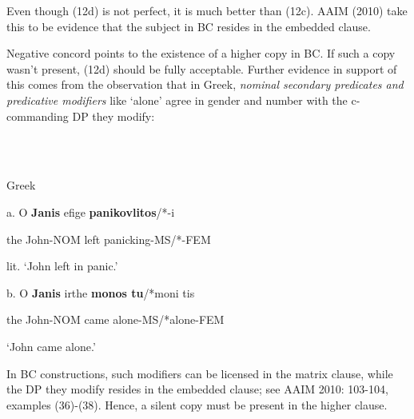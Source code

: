 \documentclass[output=paper]{langsci/langscibook}
\begin{document}
\begin{styleTextkrperxxi}
Even though (12d) is not perfect, it is much better than (12c). AAIM (2010) take this to be evidence that the subject in BC resides in the embedded clause. 
\end{styleTextkrperxxi}

\begin{styleNurTexti}
  Negative concord points to the existence of a higher copy in BC. If such a copy wasn’t present, (12d) should be fully acceptable. Further evidence in support of this comes from the observation that in Greek, \textit{nominal secondary predicates and predicative modifiers} like ‘alone’ agree in gender and number with the c-commanding DP they modify:
\end{styleNurTexti}

\begin{styleNurTexti}
\ea%
    \label{ex:key:13}
    \gll\\
        \\
    \glt
    \z

          Greek
\end{styleNurTexti}

\begin{styleNurTexti}
a.  O    \textbf{Janis}        efige  \textbf{panikovlitos}/*-i      
\end{styleNurTexti}

\begin{styleNurTexti}
    the John-NOM  left    panicking-MS/*-FEM
\end{styleNurTexti}

\begin{styleNurTexti}
    lit. ‘John left in panic.’
\end{styleNurTexti}

\begin{styleNurTexti}
  b.  O    \textbf{Janis}         irthe   \textbf{monos tu}/*moni tis
\end{styleNurTexti}

\begin{styleNurTexti}
    the John-NOM  came   alone-MS/*alone-FEM
\end{styleNurTexti}

\begin{styleNurTexti}
    ‘John came alone.’  
\end{styleNurTexti}

\begin{styleNurTexti}
In BC constructions, such modifiers can be licensed in the matrix clause, while the DP they modify resides in the embedded clause; see AAIM 2010: 103-104, examples (36)-(38). Hence, a silent copy must be present in the higher clause. 
\end{styleNurTexti}
\end{document}
